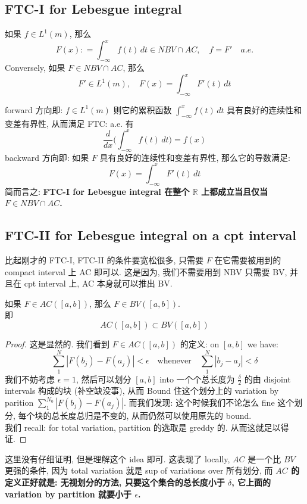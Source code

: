 \documentclass[lang=cn,11pt]{elegantbook}
\begin{document}
\subsection{FTC-I for Lebesgue integral}
\begin{corollary}{}
    如果 $f \in L^1(m)$, 那么 \[
    F(x) : = \int_{-\infty}^x f(t) \,d t \in NBV \cap AC,\quad     f = F' \quad a.e.
    \]
Conversely, 如果 $F \in NBV \cap AC$, 那么 \[
    F' \in L^1(m), \quad F(x) = \int_{-\infty}^x F'(t) \, dt
    \]
\end{corollary}
\begin{remark}
forward 方向即: $f\in L^1(m)$ 则它的累积函数 $\int_{-\infty}^x f(t) \,d t $ 具有良好的连续性和变差有界性, 从而满足 FTC: a.e. 有 \[
\frac{d}{dx} \bigg( \int_{-\infty}^x f(t) \,d t  \bigg) = f(x)
\]
backward 方向即: 如果 $F$ 具有良好的连续性和变差有界性, 那么它的导数满足: \[F(x) = \int_{-\infty}^x F'(t) \, dt    \]
简而言之: \textbf{FTC-I for Lebesgue integral 在整个 $\mathbb{R}$ 上都成立当且仅当 $F \in NBV \cap AC$.}
\end{remark}


\subsection{FTC-II for Lebesgue integral on a cpt interval}
比起刚才的 FTC-I, FTC-II 的条件要宽松很多, 只需要 $F$ 在它需要被用到的 compact interval 上 AC 即可以. 这是因为, 我们不需要用到 NBV 只需要 BV, 并且在 cpt interval 上, AC 本身就可以推出 BV.
\begin{lemma}
    如果 $F\in AC([a,b])$, 那么 $F\in BV([a,b])$.\\
    即 \[
    AC([a,b]) \subset BV([a,b])
    \]
\end{lemma}
\begin{proof}
    这是显然的. 我们看到 $F \in AC([a,b])$ 的定义: on $[a,b]$ we have: \[
\sum_1^N |F(b_j) - F(a_j)| <\epsilon \quad  \text{whenever}\quad \sum_1^N |b_j - a_j| <\delta
\]
我们不妨考虑 $\epsilon = 1$, 然后可以划分 $[a,b]$ into 一个个总长度为 $\frac{\delta}{2}$ 的由 disjoint intervals 构成的块 (补空缺没事), 从而 Bound 住这个划分上的 variation by parition \(\sum_1^{N_0} |F(b_j) - F(a_j)| \). 而我们发现: 这个时候我们不论怎么 fine 这个划分, 每个块的总长度总归是不变的, 从而仍然可以使用原先的 bound.\\
我们 recall: for total variation, partition 的选取是 greddy 的. 从而这就足以得证.
\end{proof}
\begin{remark}
这里没有仔细证明, 但是理解这个 idea 即可. 这表现了 locally, $AC$ 是一个比 $BV$ 更强的条件, 因为 total variation 就是 sup of variations over 所有划分, 而 \textbf{$AC$ 的定义正好就是: 无视划分的方法, 只要这个集合的总长度小于 $\delta$, 它上面的 variation by partition 就要小于 $\epsilon$. }
\end{remark}
\end{document}
